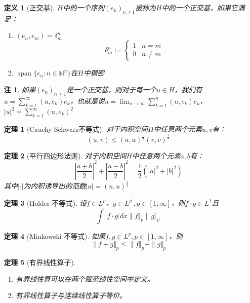 \documentclass{article}                     %
\numberwithin{equation}{section}            %
\numberwithin{figure}{section}              %
\numberwithin{table}{section}               %
\DeclareMathOperator{\spann}{span}          %
\newtheorem{theorem}{\indent 定理}[section] %
\newtheorem{definition}{\indent 定义}[section]
\newtheorem{remark}{\indent 注}[section]
\begin{document}
\begin{definition}[正交基]
    $H$中的一个序列$(e_n)_{n\ge 1}$被称为$H$中的一个正交基，如果它满足：
    \begin{enumerate}
        \item $(e_n,e_m)=\delta _m^n$
        \begin{equation*}
            \delta _m^n:=\left\{\begin{matrix}
                1&n=m \\
                0&n\ne m
              \end{matrix}\right.
        \end{equation*}
        \item $\spann\{e_n:n\in \mathbb{N} ^n\}$在$H$中稠密
    \end{enumerate}
\end{definition}
\begin{remark}
    如果$(e_n)_{n\ge 1}$是一个正交基，则对于每一个$u\in H$，我们有$u=\sum_{k=1}^{\infty}(u,e_k)e_k$，也就是说$u=\lim_{n\to \infty}\sum_{k=1}^{n}(u,e_k)e_k$，$|u|^2=\sum_{k=1}^{\infty}(u,e_k)^2$
\end{remark}

\begin{theorem}[Cauchy-Schwarz不等式]
    对于内积空间$H$中任意两个元素$u,v$有：
    $$(u,v)\le (u,u)^{\frac{1}{2}}(v,v)^{\frac{1}{2}}$$
\end{theorem}

\begin{theorem}[平行四边形法则]
    对于内积空间$H$中任意两个元素$a,b$有：
    $$|\frac{a+b}{2}|^2+|\frac{a-b}{2}|^2=\frac{1}{2}(|a|^2+|b|^2)$$
    其中$|\cdot|$为内积诱导出的范数$|u |=(u,u)^{\frac{1}{2}}$
\end{theorem}



\begin{theorem}[Holder 不等式]
    设$f\in L^p$，$g\in L^{p^{\prime}},p\in [1,\infty ]$，则$f\cdot g\in L^1$且
    $$\int |f\cdot g|dx\| f\Vert_p \| g\Vert_{p^{\prime}} $$
\end{theorem}

\begin{theorem}[Minkowski 不等式]
    如果$f,g\in L^p,p\in [1,\infty ]$，则
    $$\| f+g\Vert_p \le \| f\Vert_p +\| g\Vert_p $$
\end{theorem}


\begin{theorem}[有界线性算子]
    \begin{enumerate}
        \item 有界线性算可以在两个赋范线性空间中定义。
        \item 有界线性算子与连续线性算子等价。
    \end{enumerate}
\end{theorem}
\end{document}
